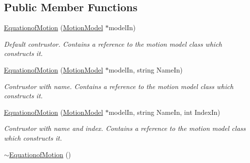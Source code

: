 \subsection*{Public Member Functions}
\begin{DoxyCompactItemize}
\item 
\hyperlink{class_equationof_motion_a61c6e25419cf9c5402a4e30496ef6b19}{Equationof\-Motion} (\hyperlink{class_motion_model}{Motion\-Model} $\ast$model\-In)
\begin{DoxyCompactList}\small\item\em Default contrustor. Contains a reference to the motion model class which constructs it. \end{DoxyCompactList}\item 
\hyperlink{class_equationof_motion_ab14c4d8fe983c227f2da6f0d0a616ce2}{Equationof\-Motion} (\hyperlink{class_motion_model}{Motion\-Model} $\ast$model\-In, string Name\-In)
\begin{DoxyCompactList}\small\item\em Contrustor with name. Contains a reference to the motion model class which constructs it. \end{DoxyCompactList}\item 
\hyperlink{class_equationof_motion_a401237a25c78282de0640c5175d02943}{Equationof\-Motion} (\hyperlink{class_motion_model}{Motion\-Model} $\ast$model\-In, string Name\-In, int Index\-In)
\begin{DoxyCompactList}\small\item\em Contrustor with name and index. Contains a reference to the motion model class which constructs it. \end{DoxyCompactList}\item 
\hypertarget{class_equationof_motion_ab06097df1a54719d7a5682babbd9f233}{\hyperlink{class_equationof_motion_ab06097df1a54719d7a5682babbd9f233}{$\sim$\-Equationof\-Motion} ()}\label{class_equationof_motion_ab06097df1a54719d7a5682babbd9f233}


\end{DoxyCompactItemize}
